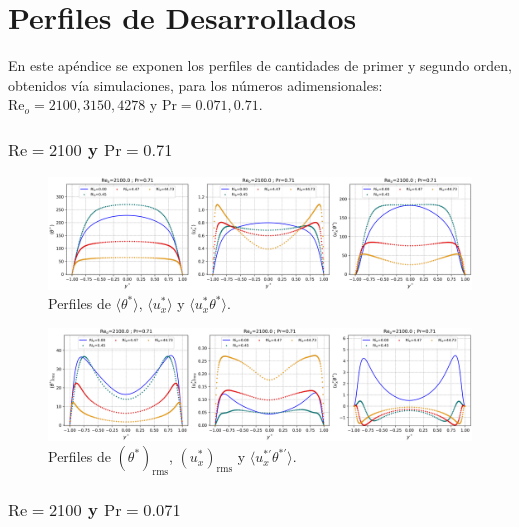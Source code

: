\chapter{Perfiles de Desarrollados} \label{apen:desarrollado}

En este apéndice se exponen los perfiles de cantidades de primer y segundo orden, obtenidos vía simulaciones, para los números adimensionales: $\text{Re}_o=2100,3150,4278$ y $\text{Pr}=0\text{.}071,0\text{.}71$. 

\subsection*{$\text{Re}=2100$ y $\text{Pr}=0\text{.}71$}

\begin{figure}[H]
  \centering
    \includegraphics[width=\textwidth]{figures/apendices/developed/Re2100-Pr071_merged_phi-ux-uxphi.png}
  \caption{Perfiles de  $\langle \theta^* \rangle$,  $\langle u^*_x \rangle$ y   $\langle u^*_x \theta^* \rangle$.}
  \label{fig:profs-Re2100-Pr071}
\end{figure}

\begin{figure}[H]
  \centering
    \includegraphics[width=\textwidth]{figures/apendices/developed/Re2100-Pr071_merged_phif-uxf-uxphif.png}
  \caption{Perfiles de  $( \theta^*)_{\text{rms}}$,  $(u^*_x)_{\text{rms}}$ y  $\langle u^{* \prime}_x \theta^{* \prime} \rangle$.}
  \label{fig:profs-Re2100-Pr071}
\end{figure}

\subsection*{$\text{Re}=2100$ y $\text{Pr}=0\text{.}071$}

